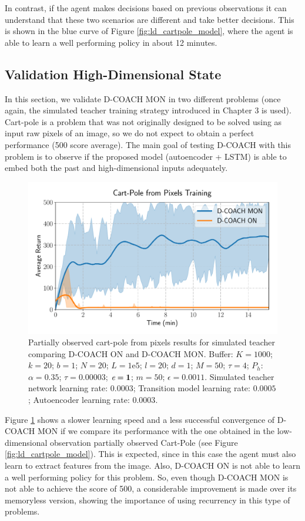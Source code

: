 In contrast, if the agent makes decisions based on previous observations it can understand that these two scenarios are different and take better decisions. This is shown in the blue curve of Figure \ref{fig:ld_cartpole_model}, where the agent is able to learn a well performing policy in about 12 minutes. 

\subsection{Validation High-Dimensional State}
In this section, we validate D-COACH MON in two different problems (once again, the simulated teacher training strategy introduced in Chapter 3 is used). Cart-pole is a problem that was not originally designed to be solved using as input raw pixels of an image, so we do not expect to obtain a perfect performance (500 score average). The main goal of testing D-COACH with this problem is to observe if the proposed model (autoencoder + LSTM) is able to embed both the past and high-dimensional inputs adequately.

\begin{figure}[h]
    \centering
    \includegraphics[width=0.7\linewidth]{imagenes/cap3/cartpole_HD_model.pdf}
    \caption[Partially observed Cart-Pole from pixels results for simulated teacher comparing D-COACH ON and D-COACH MON.]{Partially observed cart-pole from pixels results for simulated teacher comparing D-COACH ON and D-COACH MON.  Buffer: $K = 1000$; $k=20$; $b = 1$; $N = 20$; $L=1\mathrm{e}5$; $l=20$; $d=1$; $M=50$; $\tau=4$; $P_{h}$: $\alpha = 0.35$; $\tau = 0.00003$; $\emph{e}=\textbf{1}$; $m=50$; $\epsilon=0.0011$. Simulated teacher network learning rate: $0.0003$; Transition model learning rate: $0.0005$; Autoencoder learning rate: $0.0003$.}
    \label{fig:cp_hd}
\end{figure}

Figure \ref{fig:cp_hd} shows a slower learning speed and a less successful convergence of D-COACH MON if we compare its performance with the one obtained in the low-dimensional observation partially observed Cart-Pole (see Figure \ref{fig:ld_cartpole_model}). This is expected, since in this case the agent must also learn to extract features from the image. Also, D-COACH ON is not able to learn a well performing policy for this problem. So, even though D-COACH MON is not able to achieve the score of 500, a considerable improvement is made over its memoryless version, showing the importance of using recurrency in this type of problems.

